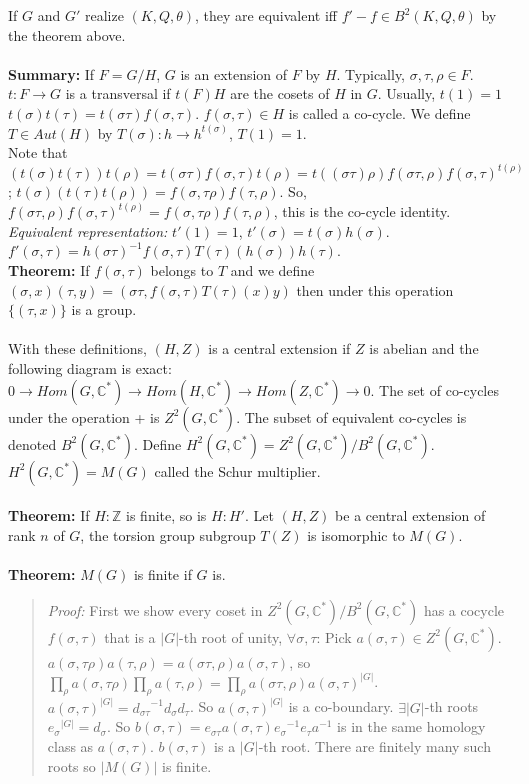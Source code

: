If $G$ and $G'$ realize $(K, Q, \theta)$, they are equivalent iff $f' - f \in B^2(K, Q, \theta)$ by the theorem
above.
\\
\\
{\bf Summary:} If $F=G/H$, $G$ is an extension of $F$ by $H$.  Typically, $\sigma, \tau, \rho \in F$.
$t: F \rightarrow G$ is a transversal if $t(F)H$ are the cosets of $H$ in $G$.  Usually, $t(1)=1$
\\
$t(\sigma) t(\tau) = t(\sigma \tau) f(\sigma, \tau)$. $f(\sigma, \tau) \in H$ is called a co-cycle. We define
$T \in Aut(H)$ by $T(\sigma): h \rightarrow h^{t(\sigma)}$, $T(1)=1$.\\
Note that
$(t(\sigma) t(\tau)) t(\rho) = t(\sigma \tau) f(\sigma, \tau) t(\rho)=
t((\sigma \tau) \rho) f(\sigma \tau, \rho) f(\sigma, \tau)^{t(\rho)}$;
$t(\sigma) (t(\tau) t(\rho)) = f(\sigma, \tau \rho) f(\tau, \rho)$.  So,
$f(\sigma \tau, \rho) f(\sigma, \tau)^{t(\rho)}= f(\sigma, \tau \rho) f(\tau, \rho)$, this is the co-cycle identity.
\\
\emph{Equivalent representation:} $t'(1)=1$, $t'(\sigma)= t(\sigma) h(\sigma)$.
$f' (\sigma , \tau) = h(\sigma \tau)^{-1} f(\sigma, \tau) T(\tau)(h(\sigma)) h(\tau)$.
\\
{\bf Theorem:} If $f(\sigma, \tau)$ belongs to $T$ and we define
$(\sigma, x) (\tau, y)= (\sigma \tau, f(\sigma, \tau) T(\tau)(x)y)$ then under this operation $\{ (\tau, x) \}$
is a group.
\\
\\
With these definitions, $(H, Z)$ is a central extension if $Z$ is abelian and the following diagram is exact:
$0 \rightarrow Hom(G, {\mathbb C}^*) \rightarrow  Hom(H, {\mathbb C}^*) \rightarrow  Hom(Z, {\mathbb C}^*) \rightarrow  0$.
The set of co-cycles under the operation + is $Z^2(G, {\mathbb C}^*)$. The subset of equivalent co-cycles is denoted
$B^2(G, {\mathbb C}^*)$.  Define $H^2(G, {\mathbb C}^*) = Z^2(G, {\mathbb C}^*)/B^2(G, {\mathbb C}^*)$.
$H^2(G, {\mathbb C}^*) = M(G)$ called the Schur multiplier.
\\
\\
{\bf Theorem:} If $H:{\mathbb Z}$ is finite, so is $H:H'$.  Let $(H, Z)$ be a central extension of rank $n$ of $G$,
the torsion group subgroup $T(Z)$ is isomorphic to $M(G)$.
\\
\\
{\bf Theorem:} $M(G)$ is finite if $G$ is.
\begin{quote}
\emph{Proof:}
First we show every coset in $Z^2(G, {\mathbb C}^*)/B^2(G, {\mathbb C}^*)$ has a cocycle $f(\sigma, \tau)$ that
is a $|G|$-th root of unity, $\forall \sigma, \tau$: Pick $a(\sigma, \tau) \in Z^2(G, {\mathbb C}^*)$.
$a(\sigma, \tau \rho) a(\tau, \rho) = a(\sigma \tau, \rho) a(\sigma, \tau)$, so
$\prod_{\rho} a(\sigma, \tau \rho) \prod_{\rho} a(\tau, \rho) = \prod_{\rho} a(\sigma \tau, \rho) a(\sigma, \tau)^{|G|}$.
$a(\sigma, \tau)^{|G|} = {d_{\sigma \tau}}^{-1} d_{\sigma} d_{\tau}$.  So $a(\sigma, \tau)^{|G|}$ is a co-boundary.
$\exists |G|$-th roots ${e_{\sigma}}^{|G|} = d_{\sigma}$.
So $b(\sigma, \tau) = e_{\sigma \tau} a(\sigma, \tau) {e_{\sigma}}^{-1} {{e_\tau}a}^{-1}$ is in the same homology class as
$a(\sigma , \tau)$.  $b(\sigma , \tau)$ is a $|G|$-th root.  There are finitely many such roots so $|M(G)|$ is finite.
\end{quote}
